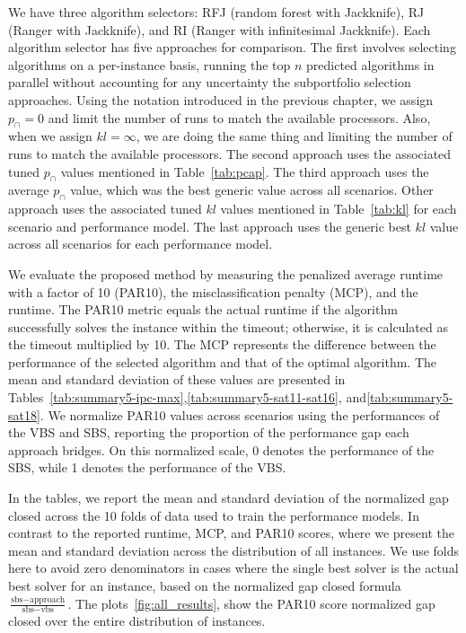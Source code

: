 We have three algorithm selectors: RFJ (random forest with Jackknife), RJ (Ranger with Jackknife), and RI (Ranger with infinitesimal Jackknife). Each algorithm selector has five approaches for comparison. The first involves selecting algorithms on a per-instance basis, running the top $n$ predicted algorithms in parallel without accounting for any uncertainty the subportfolio selection approaches. Using the notation introduced in the previous chapter, we assign $p_{\cap}=0$ and limit the number of runs to match the available processors. Also, when we assign $kl = \infty$, we are doing the same thing and limiting the number of runs to match the available processors. The second approach uses the associated tuned $p_{\cap}$ values mentioned in Table~\ref{tab:pcap}. The third approach uses the average $p_{\cap}$ value, which was the best generic value across all scenarios. Other approach uses the associated tuned $kl$ values mentioned in Table~\ref{tab:kl} for each scenario and performance model. The last approach uses the generic best $kl$ value across all scenarios for each performance model.

We evaluate the proposed method by measuring the penalized average runtime with a factor of 10 (PAR10), the misclassification penalty (MCP), and the runtime. The PAR10 metric equals the actual runtime if the algorithm successfully solves the instance within the timeout; otherwise, it is calculated as the timeout multiplied by 10. The MCP represents the difference between the performance of the selected algorithm and that of the optimal algorithm. The mean and standard deviation of these values are presented in Tables~\ref{tab:summary5-ipc-max},\ref{tab:summary5-sat11-sat16}, and\ref{tab:summary5-sat18}. We normalize PAR10 values across scenarios using the performances of the VBS and SBS, reporting the proportion of the performance gap each approach bridges. On this normalized scale, 0 denotes the performance of the SBS, while 1 denotes the performance of the VBS. 

In the tables, we report the mean and standard deviation of the normalized gap closed across the 10 folds of data used to train the performance models. In contrast to the reported runtime, MCP, and PAR10 scores, where we present the mean and standard deviation across the distribution of all instances. We use folds here to avoid zero denominators in cases where the single best solver is the actual best solver for an instance, based on the normalized gap closed formula $\frac{\text{sbs} - \text{approach}}{\text{sbs} - \text{vbs}}$. The plots~\ref{fig:all_results}, show the PAR10 score normalized gap closed over the entire distribution of instances.

